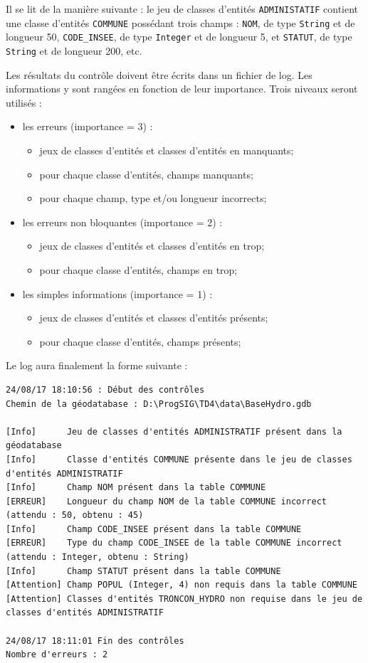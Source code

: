 \documentclass[11pt]{article}
\newcommand{\code}[1]{\lstinline{#1}}
\begin{document}
Il se lit de la manière suivante : le jeu de classes d'entités \code{ADMINISTATIF} contient une classe d'entités \code{COMMUNE} possédant trois champs : \code{NOM}, de type \code{String} et de longueur 50,   \code{CODE_INSEE}, de type \code{Integer} et de longueur 5, et \code{STATUT}, de type \code{String} et de longueur 200, etc.

Les résultats du contrôle doivent être écrits dans un fichier de log. Les informations y sont rangées en fonction de leur importance. Trois niveaux seront utilisés :
\begin{itemize}
	\item les erreurs (importance = 3) :
	\begin{itemize}
		\item jeux de classes d'entités et classes d'entités en manquants;
		\item pour chaque classe d'entités, champs manquants;
		\item pour chaque champ, type et/ou longueur incorrects;
	\end{itemize}
	\item les erreurs non bloquantes (importance = 2) :
	\begin{itemize}
		\item jeux de classes d'entités et classes d'entités en trop;
		\item pour chaque classe d'entités, champs en trop;
	\end{itemize}
	\item les simples informations (importance = 1) :
	\begin{itemize}
		\item jeux de classes d'entités et classes d'entités présents;
		\item pour chaque classe d'entités, champs présents;
	\end{itemize}
\end{itemize}

Le log aura finalement la forme suivante :
\begin{Verbatim}[fontsize=\scriptsize]
24/08/17 18:10:56 : Début des contrôles
Chemin de la géodatabase : D:\ProgSIG\TD4\data\BaseHydro.gdb

[Info]		Jeu de classes d'entités ADMINISTRATIF présent dans la géodatabase
[Info]		Classe d'entités COMMUNE présente dans le jeu de classes d'entités ADMINISTRATIF
[Info]		Champ NOM présent dans la table COMMUNE
[ERREUR]	Longueur du champ NOM de la table COMMUNE incorrect (attendu : 50, obtenu : 45)
[Info]		Champ CODE_INSEE présent dans la table COMMUNE
[ERREUR]	Type du champ CODE_INSEE de la table COMMUNE incorrect (attendu : Integer, obtenu : String)
[Info]		Champ STATUT présent dans la table COMMUNE
[Attention]	Champ POPUL (Integer, 4) non requis dans la table COMMUNE
[Attention]	Classes d'entités TRONCON_HYDRO non requise dans le jeu de classes d'entités ADMINISTRATIF

24/08/17 18:11:01 Fin des contrôles
Nombre d'erreurs : 2
\end{Verbatim}
\end{document}
